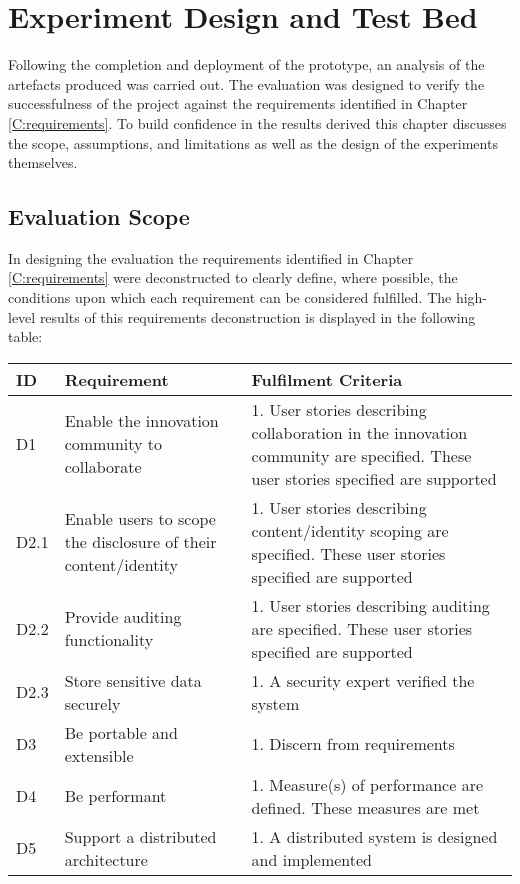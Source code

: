 \chapter{Experiment Design and Test Bed}
Following the completion and deployment of the prototype, an analysis of the artefacts produced was carried out. The evaluation was designed to verify the successfulness of the project against the requirements identified in Chapter \ref{C:requirements}. To build confidence in the results derived this chapter discusses the scope, assumptions, and limitations as well as the design of the experiments themselves.

\section{Evaluation Scope}
In designing the evaluation the requirements identified in Chapter \ref{C:requirements} were deconstructed to clearly define, where possible, the conditions upon which each requirement can be considered fulfilled. The high-level results of this requirements deconstruction is displayed in the following table:

\begin{adjustwidth}{-1.25cm}{}
\begin{tabular}{ |p{1cm}||p{6cm}|p{10cm}|  }
 \hline
 ID & Requirement & Fulfilment Criteria\\
 \hline
    D1 & Enable the innovation community to collaborate & 1. User stories describing collaboration in the innovation 
  community are specified\newline2. These user stories specified are supported\\
 \hline
    D2.1 & Enable users to scope the disclosure of their content/identity & 1. User stories describing content/identity scoping are specified\newline2. These user stories specified are supported\\
 \hline
    D2.2 & Provide auditing functionality & 1. User stories describing auditing are specified\newline2. These user stories specified are supported\\
 \hline
    D2.3 & Store sensitive data securely & 1. A security expert verified the system\\
 \hline
    D3 & Be portable and extensible & 1. Discern from requirements\\
 \hline
    D4 & Be performant & 1. Measure(s) of performance are defined\newline2. These measures are met\\
 \hline
    D5 & Support a distributed architecture & 1. A distributed system is designed and implemented\\
 \hline
\end{tabular}
\end{adjustwidth}
\vspace{1em}

